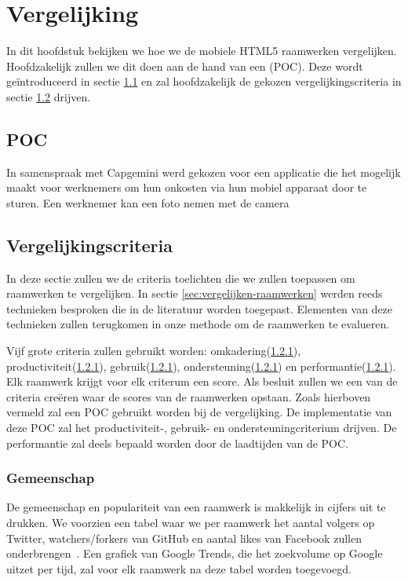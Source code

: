 \chapter{Vergelijking}
\label{chap:vergelijking}

In dit hoofdstuk bekijken we hoe we de mobiele HTML5 raamwerken vergelijken.
Hoofdzakelijk zullen we dit doen aan de hand van een  (POC).
Deze wordt geïntroduceerd in sectie \ref{sec:vergelijking-poc} en zal hoofdzakelijk de gekozen vergelijkingscriteria in sectie \ref{sec:vergelijking-criteria} drijven.


\section{POC} %
\label{sec:vergelijking-poc}
In samenspraak met Capgemini werd gekozen voor een applicatie die het mogelijk maakt voor werknemers om hun onkosten via hun mobiel apparaat door te sturen.
Een werknemer kan een foto nemen met de camera 

\section{Vergelijkingscriteria} %
\label{sec:vergelijking-criteria}

In deze sectie zullen we de criteria toelichten die we zullen toepassen om raamwerken te vergelijken.
In sectie \ref{sec:vergelijken-raamwerken} werden reeds technieken besproken die in de literatuur worden toegepast.
Elementen van deze technieken zullen terugkomen in onze methode om de raamwerken te evalueren.

Vijf grote criteria zullen gebruikt worden:  omkadering(\ref{sec:vergelijking-gemeenschap}), productiviteit(\ref{sec:vergelijking-gemeenschap}), gebruik(\ref{sec:vergelijking-gemeenschap}), ondersteuning(\ref{sec:vergelijking-gemeenschap}) en performantie(\ref{sec:vergelijking-gemeenschap}). Elk raamwerk krijgt voor elk criterum een score. 
Als besluit zullen we een  van de criteria creëren waar de scores van de raamwerken opstaan. 
Zoals hierboven vermeld zal een POC gebruikt worden bij de vergelijking.
De implementatie van deze POC zal het productiviteit-, gebruik- en ondersteuningcriterium drijven.  
De performantie zal deels bepaald worden door de laadtijden van de POC.


\subsection{Gemeenschap}
\label{sec:vergelijking-gemeenschap}
De gemeenschap en populariteit van een raamwerk is makkelijk in cijfers uit te drukken. 
We voorzien een tabel waar we per raamwerk het aantal volgers op Twitter, watchers/forkers van GitHub en aantal likes van Facebook zullen onderbrengen~\cite{Sarrafi2012a,Ayuso2012}. 
Een grafiek van Google Trends, die het zoekvolume op Google uitzet per tijd, zal voor elk raamwerk na deze tabel worden toegevoegd.

